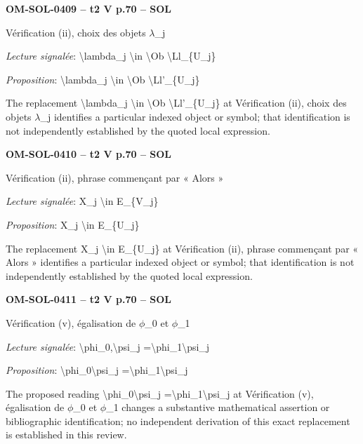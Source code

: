\par\noindent\textbf{OM-SOL-0409 -- t2 V p.70 -- SOL}\par
Vérification (ii), choix des objets \ensuremath{\lambda}\_j\par
\emph{Lecture signalée}: \textbackslash{}lambda\_j \textbackslash{}in \textbackslash{}Ob \textbackslash{}Ll\_\{U\_j\}\par
\emph{Proposition}: \textbackslash{}lambda\_j \textbackslash{}in \textbackslash{}Ob \textbackslash{}Ll'\_\{U\_j\}\par
The replacement \textbackslash{}lambda\_j \textbackslash{}in \textbackslash{}Ob \textbackslash{}Ll'\_\{U\_j\} at Vérification (ii), choix des objets \ensuremath{\lambda}\_j identifies a particular indexed object or symbol; that identification is not independently established by the quoted local expression.\par
\par\noindent\textbf{OM-SOL-0410 -- t2 V p.70 -- SOL}\par
Vérification (ii), phrase commençant par « Alors »\par
\emph{Lecture signalée}: X\_j \textbackslash{}in E\_\{V\_j\}\par
\emph{Proposition}: X\_j \textbackslash{}in E\_\{U\_j\}\par
The replacement X\_j \textbackslash{}in E\_\{U\_j\} at Vérification (ii), phrase commençant par « Alors » identifies a particular indexed object or symbol; that identification is not independently established by the quoted local expression.\par
\par\noindent\textbf{OM-SOL-0411 -- t2 V p.70 -- SOL}\par
Vérification (v), égalisation de \ensuremath{\phi}\_0 et \ensuremath{\phi}\_1\par
\emph{Lecture signalée}: \textbackslash{}phi\_0,\textbackslash{}psi\_j =\allowbreak  \textbackslash{}phi\_1\textbackslash{}psi\_j\par
\emph{Proposition}: \textbackslash{}phi\_0\textbackslash{}psi\_j =\allowbreak  \textbackslash{}phi\_1\textbackslash{}psi\_j\par
The proposed reading \textbackslash{}phi\_0\textbackslash{}psi\_j =\allowbreak  \textbackslash{}phi\_1\textbackslash{}psi\_j at Vérification (v), égalisation de \ensuremath{\phi}\_0 et \ensuremath{\phi}\_1 changes a substantive mathematical assertion or bibliographic identification; no independent derivation of this exact replacement is established in this review.\par
